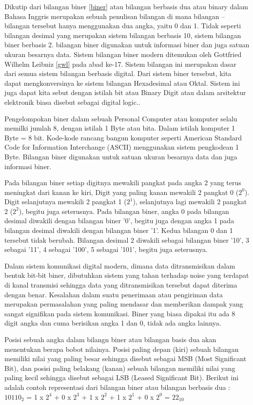 Dikutip dari \cite{hutahaean2015konsep} bilangan biner \ref{biner} atau bilangan berbasis dua atau binary dalam Bahasa Inggris merupakan sebuah penulisan bilangan di mana bilangan – bilangan tersebut hanya menggunakan dua angka, yaitu 0 dan 1. Tidak seperti bilangan desimal yang merupakan sistem bilangan berbasis 10, sistem bilangan biner berbasis 2. bilangan biner digunakan untuk informasi biner dan juga satuan ukuran besarnya data. Sistem bilangan biner modern ditemukan oleh Gottfried Wilhelm Leibniz \ref{gwl} pada abad ke-17. Sistem bilangan ini merupakan dasar dari semua sistem bilangan berbasis digital. Dari sistem biner tersebut, kita dapat mengkonversinya ke sistem bilangan Hexadesimal atau Oktal. Sistem ini juga dapat kita sebut dengan istilah bit atau Binary Digit atau dalam arsitektur elektronik biasa disebut sebagai digital logic.. 

Pengelompokan biner dalam sebuah Personal Computer atau komputer selalu memilki jumlah 8, dengan istilah 1 Byte atau bita. Dalam istilah komputer 1 Byte = 8 bit. Kode-kode rancang bangun komputer seperti American Standard Code for Information Interchange (ASCII) menggunakan sistem pengkodean 1 Byte. Bilangan biner digunakan untuk satuan ukuran besarnya data dan juga informasi biner.

 
Pada bilangan biner setiap digitnya mewakili pangkat pada angka 2 yang terus meningkat dari kanan ke kiri, Digit yang paling kanan mewakili 2 pangkat 0 ($2^0$). Digit selanjutnya mewakili 2 pangkat 1 ($2^1$), selanjutnya lagi mewakili 2 pangkat 2 ($2^2$), begitu juga seterusnya. Pada bilangan biner, angka 0 pada bilangan desimal diwakili dengan bilangan biner '0', begitu juga dengan angka 1 pada bilangan desimal diwakili dengan bilangan biner '1'. Kedua bilangan 0 dan 1 tersebut tidak berubah. Bilangan desimal 2 diwakili sebagai bilangan biner '10', 3 sebagai '11', 4 sebagai '100', 5 sebagai '101', begitu juga seterusnya.

Dalam sistem komunikasi digital modern, dimana data ditransmisikan dalam bentuk bit-bit biner, dibutuhkan sistem yang tahan terhadap noise yang terdapat di kanal transmisi sehingga data yang ditransmisikan tersebut dapat diterima dengan benar. Kesalahan dalam suatu penerimaan atau pengiriman data merupakan permasalahan yang paling mendasar dan memberikan dampak yang sangat signifikan pada sistem komunikasi. Biner yang biasa dipakai itu ada 8 digit angka dan cuma berisikan angka 1 dan 0, tidak ada angka lainnya.

Posisi sebuah angka dalam bilangn biner atau bilangan basis dua akan menentukan berapa bobot nilainya. Posisi paling depan (kiri) sebuah bilangan memiliki nilai yang paling besar sehingga disebut sebagai MSB (Most Significant Bit), dan posisi paling belakang (kanan) sebuah bilangan memiliki nilai yang paling kecil sehingga disebut sebagai LSB (Leased Significant Bit). Berikut ini adalah contoh representasi dari bilangan biner atau bilangan berbasis dua : 
$10110_2$ = 1 x $2^4$ + 0 x $2^3$ + 1 x $2^2$ + 1 x $2^1$ + 0 x $2^0$ = $22_{10}$

